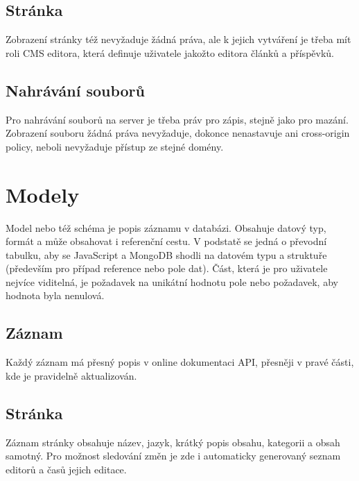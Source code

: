 \subsection{Stránka}
Zobrazení stránky též nevyžaduje žádná práva, ale k jejich vytváření je třeba mít roli CMS editora, která
definuje uživatele jakožto editora článků a příspěvků.

\subsection{Nahrávání souborů}
Pro nahrávání souborů na server je třeba práv pro zápis, stejně jako pro mazání.
Zobrazení souboru žádná práva nevyžaduje, dokonce nenastavuje ani cross-origin policy, neboli
nevyžaduje přístup ze stejné domény.

\section{Modely}
Model nebo též schéma je popis záznamu v databázi. Obsahuje datový typ, formát a může obsahovat i
referenční cestu. V podstatě se jedná o převodní tabulku, aby se JavaScript a MongoDB shodli na datovém typu a
struktuře (především pro případ reference nebo pole dat). Část, která je pro uživatele nejvíce viditelná, je 
požadavek na unikátní hodnotu pole nebo požadavek, aby hodnota byla nenulová.
\subsection{Záznam} 
Každý záznam má přesný popis v online dokumentaci API, přesněji v pravé části, kde je pravidelně aktualizován.
\subsection{Stránka}
Záznam stránky obsahuje název, jazyk, krátký popis obsahu, kategorii a obsah samotný.
Pro možnost sledování změn je zde i automaticky generovaný seznam editorů a časů jejich editace.
